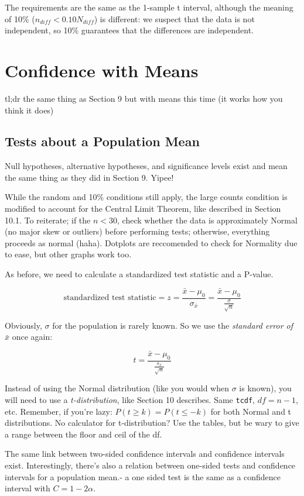 \documentclass[12pt, a4paper]{article}
\theoremstyle{definition}
\begin{document}
The requirements are the same as the 1-sample t interval, although the meaning of 10\% ($n_{diff} < 0.10N_{diff}$) is different: we suspect that the data is not independent, so 10\% guarantees that the differences are independent.





\newpage

\section{Confidence with Means}
tl;dr the same thing as Section 9 but with means this time (it works how you think it does)
\subsection{Tests about a Population Mean}
Null hypotheses, alternative hypotheses, and significance levels exist and mean the same thing as they did in Section 9. Yipee!

While the random and 10\% conditions still apply, the large counts condition is modified to account for the Central Limit Theorem, like described in Section 10.1.
To reiterate; if the $n < 30$, check whether the data is approximately Normal (no major skew or outliers) before performing tests; otherwise, everything proceeds as normal (haha).
Dotplots are reccomended to check for Normality due to ease, but other graphs work too.

As before, we need to calculate a standardized test statistic and a P-value.

\[\textrm{standardized test statistic} = z = \frac{\bar{x} - \mu_0}{\sigma_{\bar{x}}} = \frac{\bar{x} - \mu_0}{\frac{\sigma}{\sqrt{n}}}\]

Obviously, $\sigma$ for the population is rarely known. So we use the \textit{standard error of $\bar{x}$} once again:

\[t = \frac{\bar{x} - \mu_0}{\frac{s_x}{\sqrt{n}}}\]

Instead of using the Normal distribution (like you would when $\sigma$ is known), you will need to use a \textit{t-distribution}, like Section 10 describes.
Same \verb|tcdf|, $df = n - 1$, etc.
Remember, if you're lazy: $P(t \geq k) = P(t \leq -k)$ for both Normal and t distributions. No calculator for t-distribution? Use the tables, but be wary to give a range between the floor and ceil of the df.

The same link between two-sided confidence intervals and confidence intervals exist.
Interestingly, there's also a relation between one-sided tests and confidence intervals for a population mean.- a one sided test is the same as a confidence interval with $C = 1 - 2\alpha$.
\end{document}
